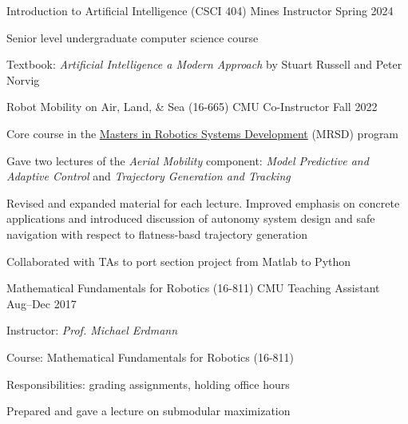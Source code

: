 
\begin{cventries}
  \cventry
  {Introduction to Artificial Intelligence (CSCI 404)}
  {Mines}
  {Instructor}
  {Spring 2024}
  {
    \begin{cvitems}
      \item Senior level undergraduate computer science course
      \item Textbook: \emph{Artificial Intelligence a Modern Approach} by
        Stuart Russell and Peter Norvig
    \end{cvitems}
  }
  \cventry
  {Robot Mobility on Air, Land, \& Sea (16-665)}
  {CMU}
  {Co-Instructor}
  {Fall 2022}
  {
    \begin{cvitems}
      \item Core course in the \href{https://mrsd.ri.cmu.edu/}{Masters in
        Robotics Systems Development} (MRSD) program
      \item Gave two lectures of the \emph{Aerial Mobility} component:
        \emph{Model Predictive and Adaptive Control}
        and
        \emph{Trajectory Generation and Tracking}
      \item Revised and expanded material for each lecture.
        Improved emphasis on concrete applications and introduced discussion of
        autonomy system design and safe navigation with respect to flatness-basd
        trajectory generation
      \item Collaborated with TAs to port section project from Matlab to Python
    \end{cvitems}
  }
  \cventry
  {Mathematical Fundamentals for Robotics (16-811)}
  {CMU}
  {Teaching Assistant}
  {Aug--Dec 2017}
  {
    Instructor: \emph{Prof. Michael Erdmann}\linebreak
    \begin{cvitems} %
    \item Course: Mathematical Fundamentals for Robotics (16-811)
    \item Responsibilities: grading assignments, holding office hours
    \item Prepared and gave a lecture on submodular maximization
    \end{cvitems}
  }
\end{cventries}

